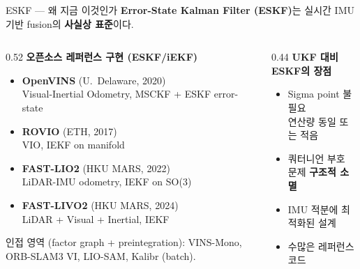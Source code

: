 \begin{frame}{ESKF — 왜 지금 이것인가}
  \textbf{Error-State Kalman Filter (ESKF)}는 실시간 IMU 기반 fusion의 \textbf{사실상 표준}이다.

  \vspace{0.6em}
  \begin{columns}[T]
    \begin{column}{0.52\textwidth}
      \textbf{오픈소스 레퍼런스 구현 (ESKF/iEKF)}
      \begin{itemize}\footnotesize
        \item \textbf{OpenVINS} (U.\ Delaware, 2020)\\
              Visual-Inertial Odometry, MSCKF + ESKF error-state
        \item \textbf{ROVIO} (ETH, 2017)\\
              VIO, IEKF on manifold
        \item \textbf{FAST-LIO2} (HKU MARS, 2022)\\
              LiDAR-IMU odometry, IEKF on SO(3)
        \item \textbf{FAST-LIVO2} (HKU MARS, 2024)\\
              LiDAR + Visual + Inertial, IEKF
      \end{itemize}
      \scriptsize 인접 영역 (factor graph + preintegration):
      VINS-Mono, ORB-SLAM3 VI, LIO-SAM, Kalibr (batch).
    \end{column}
    \begin{column}{0.44\textwidth}
      \textbf{UKF 대비 ESKF의 장점}
      \begin{itemize}\footnotesize
        \item Sigma point 불필요\\
              연산량 동일 또는 적음
        \item 쿼터니언 부호 문제 \textbf{구조적 소멸}
        \item IMU 적분에 최적화된 설계
        \item 수많은 레퍼런스 코드
      \end{itemize}
    \end{column}
  \end{columns}
\end{frame}

